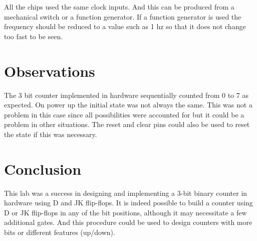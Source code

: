 \documentclass[12pt]{article}
\begin{document}
All the chips used the same clock inputs.
And this can be produced from a mechanical switch or a function generator.
If a function generator is used the frequency should be reduced
to a value such as 1 hz so that it does not change too fast to be seen.


\section{Observations}

The 3 bit counter implemented in hardware sequentially counted
from 0 to 7 as expected.
On power up the initial state was not always the same.
This was not a problem in this case since all possibilities were
accounted for but it could be a problem in other situations.
The reset and clear pins could also be used to reset the state
if this was necessary.


\section{Conclusion}

This lab was a success in designing and implementing a 3-bit binary
counter in hardware using D and JK flip-flops.
It is indeed possible to build a counter using D or JK flip-flops
in any of the bit positions, although it may necessitate
a few additional gates.
And this procedure could be used to design counters with more
bits or different features (up/down).


%
%
\end{document}
